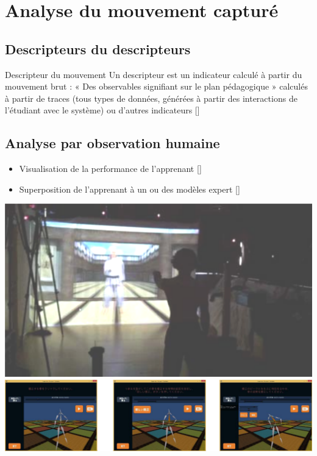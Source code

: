 \documentclass[svgnames]{beamer}
\newcommand{\mycite}[1]{[\textit{\cite{#1}}]}
\begin{document}
	\section{Analyse du mouvement capturé}
	\subsection{Descripteurs du descripteurs}
	\begin{frame}{\subsecname}
		\begin{block}{Descripteur du mouvement}
			Un descripteur est un indicateur calculé à partir du mouvement brut :  « Des observables signifiant sur le plan pédagogique » calculés à partir de traces (tous types de données, générées à partir des interactions de l’étudiant avec le système) ou d’autres indicateurs \mycite{Choquet2007MTf}
		\end{block}
	\end{frame}
	
	\subsection{Analyse par observation humaine}
	\begin{frame}{\subsecname}
		\begin{itemize}[label=$\bullet$]
			\item Visualisation de la performance de l'apprenant \mycite{Burns2011Uvh}
			\item Superposition de l'apprenant à un ou des modèles expert \mycite{Yoshinaga2015Doa}
		\end{itemize}
		\centering
			\includegraphics[scale=0.4]{img/Burns_karate.png}
			\includegraphics[scale=0.4]{img/Yoshiniga_archery.png}
	\end{frame}
	
\end{document}
